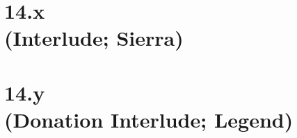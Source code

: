  \chapter[14.x (Interlude; Sierra)]{14.x\\(Interlude; Sierra)}

 \chapter[14.y (Donation Interlude; Legend)]{14.y\\(Donation Interlude; Legend)}














